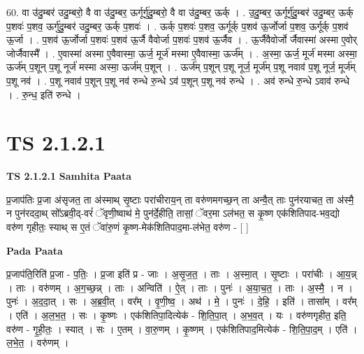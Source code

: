 \documentclass[17pt]{extarticle}
\begin{document}
60. वा उ॑दु॒म्बर॑ उदु॒म्बरो॒ वै वा उ॑दु॒म्बर॒ ऊर्गूर्गु॑दु॒म्बरो॒ वै वा उ॑दु॒म्बर॒ ऊर्क् । . उ॒दु॒म्बर॒ ऊर्गूर्गु॑दु॒म्बर॑ उदु॒म्बर॒ ऊर्क् प॒शवः॑ प॒शव॒ ऊर्गु॑दु॒म्बर॑ उदु॒म्बर॒ ऊर्क् प॒शवः॑ । . ऊर्क् प॒शवः॑ प॒शव॒ ऊर्गूर्क् प॒शव॑ ऊ॒र्जोर्जा प॒शव॒ ऊर्गूर्क् प॒शव॑ ऊ॒र्जा । . प॒शव॑ ऊ॒र्जोर्जा प॒शवः॑ प॒शव॑ ऊ॒र्जै वैवोर्जा प॒शवः॑ प॒शव॑ ऊ॒र्जैव । . ऊ॒र्जैवैवोर्जो र्जैवास्मा॑ अस्मा ए॒वोर् जोर्जैवास्मै᳚ । . ए॒वास्मा॑ अस्मा ए॒वैवास्मा॒ ऊर्ज॒ मूर्ज॑ मस्मा ए॒वैवास्मा॒ ऊर्ज᳚म् । . अ॒स्मा॒ ऊर्ज॒ मूर्ज॑ मस्मा अस्मा॒ ऊर्ज॑म् प॒शून् प॒शू नूर्ज॑ मस्मा अस्मा॒ ऊर्ज॑म् प॒शून् । . ऊर्ज॑म् प॒शून् प॒शू नूर्ज॒ मूर्ज॑म् प॒शू नवाव॑ प॒शू नूर्ज॒ मूर्ज॑म् प॒शू नव॑ । . प॒शू नवाव॑ प॒शून् प॒शू नव॑ रुन्धे रु॒न्धे ऽव॑ प॒शून् प॒शू नव॑ रुन्धे । . अव॑ रुन्धे रु॒न्धे ऽवाव॑ रुन्धे । . रु॒न्ध॒ इति॑ रुन्धे । \newline
\pagebreak
{}

\section{ TS 2.1.2.1 }

\textbf{TS 2.1.2.1 } \newline
\textbf{Samhita Paata} \newline

प्र॒जाप॑तिः प्र॒जा अ॑सृजत॒ ता अ॑स्माथ् सृ॒ष्टाः परा॑चीराय॒न् ता वरु॑णमगच्छ॒न् ता अन्वै॒त् ताः पुन॑रयाचत॒ ता अ॑स्मै॒ न पुन॑रददा॒थ् सो᳚ऽब्रवी॒द्-वरं॑ ॅवृणी॒ष्वाथ॑ मे॒ पुन॑र्दे॒हीति॒ तासां॒ ॅवर॒मा ऽल॑भत॒ स कृ॒ष्ण एक॑शितिपाद-भव॒द्यो वरु॑ण गृहीतः॒ स्याथ् स ए॒तं ॅवा॑रु॒णं कृ॒ष्ण-मेक॑शितिपाद॒मा-ल॑भेत॒ वरु॑ण - [  ] \newline

\textbf{Pada Paata} \newline

प्र॒जाप॑ति॒रिति॑ प्र॒जा - प॒तिः॒ । प्र॒जा इति॑ प्र - जाः । अ॒सृ॒ज॒त॒ । ताः । अ॒स्मा॒त् । सृ॒ष्टाः । परा॑चीः । आ॒य॒न्न् । ताः । वरु॑णम् । अ॒ग॒च्छ॒न्न् । ताः । अन्विति॑ । ऐ॒त् । ताः । पुनः॑ । अ॒या॒च॒त॒ । ताः । अ॒स्मै॒ । न । पुनः॑ । अ॒द॒दा॒त् । सः । अ॒ब्र॒वी॒त् । वर᳚म् । वृ॒णी॒ष्व॒ । अथ॑ । मे॒ । पुनः॑ । दे॒हि॒ । इति॑ । तासा᳚म् । वर᳚म् । एति॑ । अ॒ल॒भ॒त॒ । सः । कृ॒ष्णः । एक॑शितिपा॒दित्येक॑ - शि॒ति॒पा॒त् । अ॒भ॒व॒त् । यः । वरु॑णगृहीत॒ इति॒ वरु॑ण - गृ॒ही॒तः॒ । स्यात् । सः । ए॒तम् । वा॒रु॒णम् । कृ॒ष्णम् । एक॑शितिपाद॒मित्येक॑ - शि॒ति॒पा॒द॒म् । एति॑ । ल॒भे॒त॒ । वरु॑णम् ।  \newline
\end{document}
